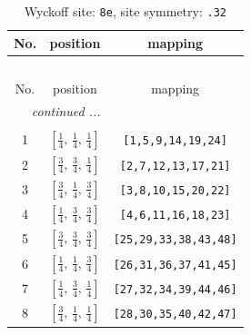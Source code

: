 \documentclass[fleqn,8pt]{jsarticle}
\begin{document}
\begin{longtable}{ccc}
\caption{Wyckoff site: {\tt 8e}, site symmetry: {\tt .32}}
 \\
 \hline \hline
No. & position & mapping \\ \hline \endfirsthead

\multicolumn{2}{l}{\tablename\ \thetable{}} \\
 \hline \hline
No. & position & mapping \\ \hline \endhead

 \hline \hline
\multicolumn{2}{r}{\footnotesize\it continued ...} \\ \endfoot

 \hline \hline
\multicolumn{2}{r}{} \\ \endlastfoot

1 & $\left[ \frac{1}{4},\, \frac{1}{4},\, \frac{1}{4} \right]$ & {\tt [1,5,9,14,19,24]} \\ \hline
2 & $\left[ \frac{3}{4},\, \frac{3}{4},\, \frac{1}{4} \right]$ & {\tt [2,7,12,13,17,21]} \\ \hline
3 & $\left[ \frac{3}{4},\, \frac{1}{4},\, \frac{3}{4} \right]$ & {\tt [3,8,10,15,20,22]} \\ \hline
4 & $\left[ \frac{1}{4},\, \frac{3}{4},\, \frac{3}{4} \right]$ & {\tt [4,6,11,16,18,23]} \\ \hline
5 & $\left[ \frac{3}{4},\, \frac{3}{4},\, \frac{3}{4} \right]$ & {\tt [25,29,33,38,43,48]} \\ \hline
6 & $\left[ \frac{1}{4},\, \frac{1}{4},\, \frac{3}{4} \right]$ & {\tt [26,31,36,37,41,45]} \\ \hline
7 & $\left[ \frac{1}{4},\, \frac{3}{4},\, \frac{1}{4} \right]$ & {\tt [27,32,34,39,44,46]} \\ \hline
8 & $\left[ \frac{3}{4},\, \frac{1}{4},\, \frac{1}{4} \right]$ & {\tt [28,30,35,40,42,47]} \\
\end{longtable}
\renewcommand{\arraystretch}{1.2}
\end{document}
